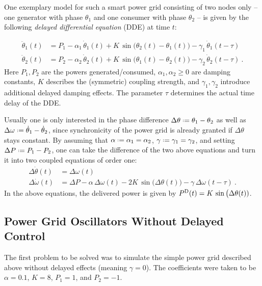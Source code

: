 \documentclass{scrartcl}
\newcommand*{\defeq}{\mathrel{\vcenter{\baselineskip0.5ex \lineskiplimit0pt
                     \hbox{\scriptsize.}\hbox{\scriptsize.}}}%
                     =}
\begin{document}
One exemplary model for such a smart power grid consisting of two nodes
only -- one generator with phase $\theta_1$ and one consumer with phase
$\theta_2$ -- is given by the following  \emph{delayed differential
equation} (DDE) at time $t$:

\begin{equation}
\begin{aligned}
    \ddot{\theta}_1(t) &= P_1 - \alpha_1\,\dot{\theta}_1(t) + 
                         K\,\sin\big(\theta_2(t) - \theta_1(t)\big) - 
                         \gamma_1\,\dot{\theta}_1(t - \tau)\\
    \ddot{\theta}_2(t) &= P_2 - \alpha_2\,\dot{\theta}_2(t) + 
                         K\,\sin\big(\theta_1(t) - \theta_2(t)\big) - 
                         \gamma_2\,\dot{\theta}_2(t - \tau)~.
\end{aligned}
\end{equation}
Here $P_1, P_2$ are the powers generated/consumed, $\alpha_1, \alpha_2\ge 0$ are
damping constants, $K$ describes the (symmetric) coupling strength, and
$\gamma_1, \gamma_2$ introduce additional delayed damping effects. The
parameter $\tau$ determines the actual time delay of the DDE.

Usually one is only interested in the phase difference $\Delta\theta
\defeq \theta_1 - \theta_2$ as well as $\Delta\omega\defeq \dot{\theta}_1
- \dot{\theta}_2$, since synchronicity of the power grid is already granted
if $\Delta\theta$ stays constant. By assuming that $\alpha \defeq \alpha_1
= \alpha_2$, $\gamma \defeq \gamma_1 = \gamma_2$, and setting $\Delta
P \defeq P_1 - P_2$, one can take the difference of the two above equations and
turn it into two coupled equations of order one:
\begin{equation}\label{eq:smart_grid}
\begin{aligned}
    \Delta\dot{\theta}(t) &= \Delta\omega(t) \\
    \Delta\dot{\omega}(t) &= \Delta P - \alpha\,\Delta\omega(t)
    - 2K\,\sin\big(\Delta\theta(t)\big) - \gamma\,\Delta\omega(t-\tau)~.
\end{aligned}
\end{equation}
In the above equations, the delivered power is given by $P^{\mathrm{D}}(t)
= K\,\sin\big(\Delta\theta(t))$.

\subsection{Power Grid Oscillators Without Delayed Control}
The first problem to be solved was to simulate the simple power grid
described above without delayed effects (meaning $\gamma = 0$). The
coefficients were taken to be $\alpha = 0.1$, $K = 8$, $P_1 = 1$, and $P_2
= -1$. 
\end{document}
